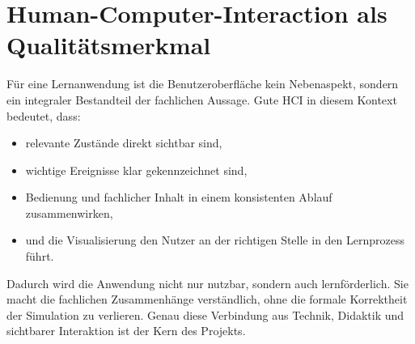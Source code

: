 \section{Human-Computer-Interaction als Qualitätsmerkmal}

Für eine Lernanwendung ist die Benutzeroberfläche kein Nebenaspekt, sondern ein integraler Bestandteil der fachlichen Aussage. Gute HCI in diesem Kontext bedeutet, dass:

\begin{itemize}
    \item relevante Zustände direkt sichtbar sind,
    \item wichtige Ereignisse klar gekennzeichnet sind,
    \item Bedienung und fachlicher Inhalt in einem konsistenten Ablauf zusammenwirken,
    \item und die Visualisierung den Nutzer an der richtigen Stelle in den Lernprozess führt.
\end{itemize}

Dadurch wird die Anwendung nicht nur nutzbar, sondern auch lernförderlich. Sie macht die fachlichen Zusammenhänge verständlich, ohne die formale Korrektheit der Simulation zu verlieren. Genau diese Verbindung aus Technik, Didaktik und sichtbarer Interaktion ist der Kern des Projekts.
